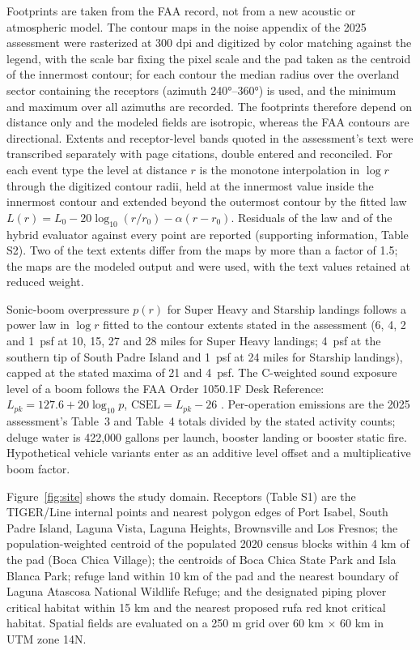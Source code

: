 \documentclass[preprint,12pt,authoryear]{elsarticle}
\begin{document}
Footprints are taken from the FAA record, not from a new acoustic or atmospheric model. The contour maps in the noise appendix of the 2025 assessment \citep{appendixb2025} were rasterized at 300 dpi and digitized by color matching against the legend, with the scale bar fixing the pixel scale and the pad taken as the centroid of the innermost contour; for each contour the median radius over the overland sector containing the receptors (azimuth 240\si{\degree}--360\si{\degree}) is used, and the minimum and maximum over all azimuths are recorded. The footprints therefore depend on distance only and the modeled fields are isotropic, whereas the FAA contours are directional. Extents and receptor-level bands quoted in the assessment's text were transcribed separately with page citations, double entered and reconciled. For each event type the level at distance $r$ is the monotone interpolation in $\log r$ through the digitized contour radii, held at the innermost value inside the innermost contour and extended beyond the outermost contour by the fitted law $L(r) = L_0 - 20\log_{10}(r/r_0) - \alpha(r - r_0)$. Residuals of the law and of the hybrid evaluator against every point are reported (supporting information, Table S2). Two of the text extents differ from the maps by more than a factor of 1.5; the maps are the modeled output and were used, with the text values retained at reduced weight.

Sonic-boom overpressure $p(r)$ for Super Heavy and Starship landings follows a power law in $\log r$ fitted to the contour extents stated in the assessment (6, 4, 2 and 1~psf at 10, 15, 27 and 28 miles for Super Heavy landings; 4~psf at the southern tip of South Padre Island and 1~psf at 24 miles for Starship landings), capped at the stated maxima of 21 and 4~psf. The C-weighted sound exposure level of a boom follows the FAA Order 1050.1F Desk Reference: $L_{pk} = 127.6 + 20\log_{10}p$, $\mathrm{CSEL} = L_{pk} - 26$ \citep{deskref2020}. Per-operation emissions are the 2025 assessment's Table~3 and Table~4 totals divided by the stated activity counts; deluge water is 422,000 gallons per launch, booster landing or booster static fire. Hypothetical vehicle variants enter as an additive level offset and a multiplicative boom factor.

Figure~\ref{fig:site} shows the study domain. Receptors (Table S1) are the TIGER/Line internal points and nearest polygon edges of Port Isabel, South Padre Island, Laguna Vista, Laguna Heights, Brownsville and Los Fresnos; the population-weighted centroid of the populated 2020 census blocks within 4 km of the pad (Boca Chica Village); the centroids of Boca Chica State Park and Isla Blanca Park; refuge land within 10 km of the pad and the nearest boundary of Laguna Atascosa National Wildlife Refuge; and the designated piping plover critical habitat within 15 km and the nearest proposed rufa red knot critical habitat. Spatial fields are evaluated on a 250 m grid over 60 km $\times$ 60 km in UTM zone 14N.
\end{document}
